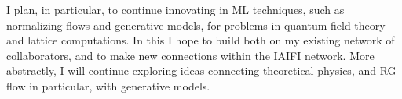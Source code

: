 \documentclass[11pt]{article}
\begin{document}
I plan, in particular, to continue innovating in ML techniques, such as normalizing flows and generative models, for problems in quantum field theory and lattice computations.
In this I hope to build both on my existing network of collaborators, and to make new connections within the IAIFI network.
More abstractly, I will continue exploring ideas connecting theoretical physics, and RG flow in particular, with generative models.



\end{document}
